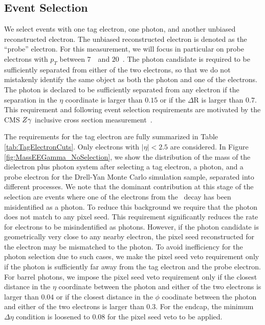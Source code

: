 \documentclass{cmspaper}
\begin{document}
\subsection{ Event Selection }

We select events with one tag electron, one photon, and another unbiased reconstructed electron.
The unbiased reconstructed electron is denoted as the ``probe'' electron. For this measurement,
we will focus in particular on probe electrons with $p_{T}$ between $7$~\GeV\ and $20$~\GeV.
The photon candidate is required to be sufficiently separated from either of the two electrons,
so that we do not mistakenly identify the same object as both the photon and one of the electrons. 
The photon is declared to be sufficiently separated from any electron if the separation 
in the $\eta$ coordinate is larger than $0.15$ or if the $\Delta$R is larger than $0.7$. 
This requirement and following event selection requirements are motivated by the CMS $Z\gamma$
inclusive cross section measurement~\cite{VGammaPaper,VGammaCMSNote}.

The requirements for the tag electron are fully summarized in Table \ref{tab:TagElectronCuts}. 
Only electrons with $|\eta| < 2.5$ are considered. In Figure \ref{fig:MassEEGamma_NoSelection}, 
we show the distribution of the mass of the dielectron plus photon system after 
selecting a tag electron, a photon, and a probe electron for the Drell-Yan 
Monte Carlo simulation sample, separated into different processes.
We note that the dominant contribution at this stage of the selection are events where one of the 
electrons from the \Z\ decay has been misidentified as a photon. To reduce this background we require
that the photon does not match to any pixel seed. This requirement significantly reduces the rate for
electrons to be misindentified as photons. However, if the photon candidate is geometrically very close
to any nearby electron, the pixel seed reconstructed for the electron may be mismatched to the photon.
To avoid inefficiency for the photon selection due to such cases, we make the pixel seed veto requirement
only if the photon is sufficiently far away from the tag electron and the probe electron. For barrel
photons, we impose the pixel seed veto requirement only if the closest distance in the $\eta$ coordinate
between the photon and either of the two electrons is larger than $0.04$ or if the closest 
distance in the $\phi$ coodinate between the photon and either of the two electrons is larger than
$0.3$. For the endcap, the minimum $\Delta\eta$ condition is loosened to $0.08$ for the pixel seed
veto to be applied.  
\end{document}
